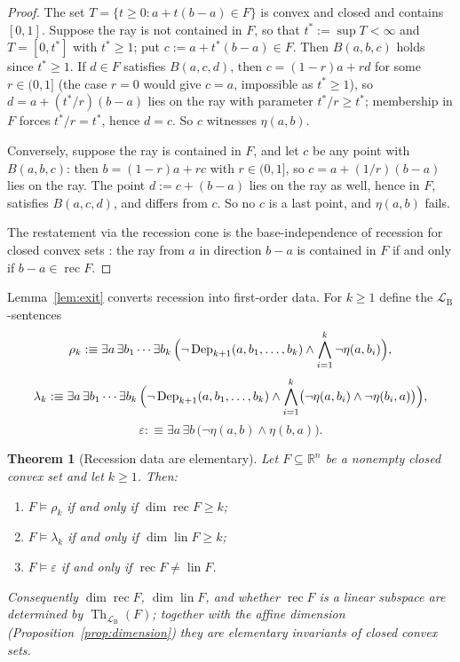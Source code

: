 \documentclass[11pt]{amsart}
\newtheorem{theorem}{Theorem}[section]
\theoremstyle{definition}
\newcommand{\R}{\mathbb{R}}
\newcommand{\LB}{\mathcal{L}_{\mathrm{B}}}
\newcommand{\Dep}{\operatorname{Dep}}
\newcommand{\rec}{\operatorname{rec}}
\newcommand{\lin}{\operatorname{lin}}
\newcommand{\Th}{\operatorname{Th}}
\begin{document}
\begin{proof}
The set $T=\{t\ge0:a+t(b-a)\in F\}$ is convex and closed and contains
$[0,1]$. Suppose the ray is not contained in $F$, so that
$t^{*}:=\sup T<\infty$ and $T=[0,t^{*}]$ with $t^{*}\ge1$; put
$c:=a+t^{*}(b-a)\in F$. Then $B(a,b,c)$ holds since $t^{*}\ge1$. If $d\in F$
satisfies $B(a,c,d)$, then $c=(1-r)a+rd$ for some $r\in(0,1]$ (the case
$r=0$ would give $c=a$, impossible as $t^{*}\ge1$), so
$d=a+(t^{*}/r)(b-a)$ lies on the ray with parameter $t^{*}/r\ge t^{*}$;
membership in $F$ forces $t^{*}/r=t^{*}$, hence $d=c$. So $c$ witnesses
$\eta(a,b)$.

Conversely, suppose the ray is contained in $F$, and let $c$ be any point
with $B(a,b,c)$: then $b=(1-r)a+rc$ with $r\in(0,1]$, so
$c=a+(1/r)(b-a)$ lies on the ray. The point $d:=c+(b-a)$ lies on the ray as
well, hence in $F$, satisfies $B(a,c,d)$, and differs from $c$. So no $c$ is
a last point, and $\eta(a,b)$ fails.

The restatement via the recession cone is the base-independence of recession
for closed convex sets \cite[Theorem~8.3]{Rockafellar70}: the ray from $a$ in
direction $b-a$ is contained in $F$ if and only if $b-a\in\rec F$.
\end{proof}

Lemma~\ref{lem:exit} converts recession into first-order data. For $k\ge1$
define the $\LB$-sentences
\[
\rho_k:\equiv\exists a\,\exists b_1\cdots\exists b_k\,
\Bigl(\neg\Dep_{k+1}(a,b_1,\dots,b_k)\wedge
\bigwedge_{i=1}^{k}\neg\eta(a,b_i)\Bigr),
\]
\[
\lambda_k:\equiv\exists a\,\exists b_1\cdots\exists b_k\,
\Bigl(\neg\Dep_{k+1}(a,b_1,\dots,b_k)\wedge
\bigwedge_{i=1}^{k}\bigl(\neg\eta(a,b_i)\wedge\neg\eta(b_i,a)\bigr)\Bigr),
\]
\[
\varepsilon:\equiv\exists a\,\exists b\,
\bigl(\neg\eta(a,b)\wedge\eta(b,a)\bigr).
\]

\begin{theorem}[Recession data are elementary]\label{thm:recession}
Let $F\subseteq\R^n$ be a nonempty closed convex set and let $k\ge1$. Then:
\begin{enumerate}[label=\textup{(\roman*)}]
\item $F\models\rho_k$ if and only if $\dim\rec F\ge k$;
\item $F\models\lambda_k$ if and only if $\dim\lin F\ge k$;
\item $F\models\varepsilon$ if and only if $\rec F\ne\lin F$.
\end{enumerate}
Consequently $\dim\rec F$, $\dim\lin F$, and whether $\rec F$ is a linear
subspace are determined by $\Th_{\LB}(F)$; together with the affine dimension
(Proposition~\ref{prop:dimension}) they are elementary invariants of closed
convex sets.
\end{theorem}
\end{document}
